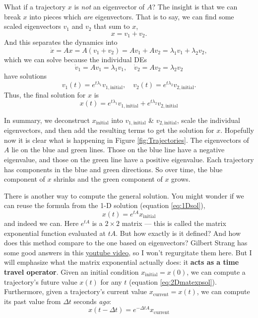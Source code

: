 \documentclass[11pt, oneside]{article}   	%
\begin{document}
What if a trajectory $x$ is \textit{not} an eigenvector of $A$?
The insight is that we can break $x$ into pieces which \textit{are} eigenvectors.
That is to say, we can find some scaled eigenvectors $v_1$ and $v_2$ that sum to $x$,
\begin{equation}
x = v_1 + v_2.
\end{equation}
And this separates the dynamics into
\begin{equation}
\dot{x} = Ax
= A(v_1 + v_2)
= A v_1 + A v_2
= \lambda_1 v_1 + \lambda_2 v_2,
\end{equation}
which we can solve because the individual DEs
$$ \dot{v}_1 = A v_1 = \lambda_1 v_1, \quad \dot{v}_2 = A v_2 = \lambda_2 v_2 $$
have solutions
$$ v_1(t) = e^{t\lambda_1}v_{1,\mathrm{initial}}, \quad v_2(t) = e^{t\lambda_2}v_{2,\mathrm{initial}} .$$
Thus, the final solution for $x$ is
\begin{equation} \label{eq:2Deigensol}
x(t) = e^{t\lambda_1}v_{1,\mathrm{initial}} + e^{t\lambda_2}v_{2,\mathrm{initial}}
\end{equation}

In summary, we deconstruct $x_\mathrm{initial}$ into $v_{1,\mathrm{initial}}$ \& $v_{2,\mathrm{initial}}$,
scale the individual eigenvectors, and then add the resulting terms to get the solution for $x$.
Hopefully now it is clear what is happening in Figure \ref{fig:Trajectories}.
The eigenvectors of $A$ lie on the blue and green lines.
Those on the blue line have a negative eigenvalue, and those on the green line have a positive eigenvalue.
Each trajectory has components in the blue and green directions.
So over time, the blue component of $x$ shrinks and the green component of $x$ grows.

There is another way to compute the general solution.
You might wonder if we can reuse the formula from the 1-D solution (equation \ref{eq:1Dsol}),
\begin{equation} \label{eq:2Dmatexpsol}
x(t) = e^{tA} x_\mathrm{initial}
\end{equation}
and indeed we can.
Here $e^{tA}$ is a $2\times 2$ matrix --- this is called the matrix exponential function evaluated at $tA$.
But how exactly is it defined?
And how does this method compare to the one based on eigenvectors?
Gilbert Strang has some good answers in this \href{https://youtu.be/LwSk9M5lJx4}{youtube video},
so I won't regurgitate them here.
But I will emphasize what the matrix exponential actually does: it \textbf{acts as a time travel operator}.
Given an initial condition $x_\mathrm{initial} = x(0)$, we can compute a trajectory's future value $x(t)$ for any $t$ (equation \ref*{eq:2Dmatexpsol}).
Furthermore, given a trajectory's current value $x_\mathrm{current} = x(t)$, we can compute its past value from $\Delta t$ seconds \textit{ago}:
\begin{equation}
x(t-\Delta t) = e^{-\Delta t A} x_\mathrm{current}
\end{equation}
\end{document}
